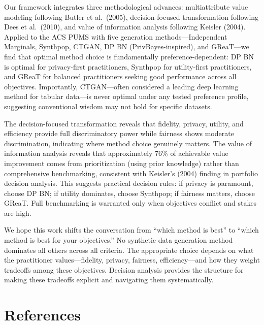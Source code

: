 \documentclass[12pt,a4paper]{article}
\begin{document}
Our framework integrates three methodological advances: multiattribute value modeling following Butler et al.\ (2005), decision-focused transformation following Dees et al.\ (2010), and value of information analysis following Keisler (2004). Applied to the ACS PUMS with five generation methods---Independent Marginals, Synthpop, CTGAN, DP BN (PrivBayes-inspired), and GReaT---we find that optimal method choice is fundamentally preference-dependent: DP BN is optimal for privacy-first practitioners, Synthpop for utility-first practitioners, and GReaT for balanced practitioners seeking good performance across all objectives. Importantly, CTGAN---often considered a leading deep learning method for tabular data---is never optimal under any tested preference profile, suggesting conventional wisdom may not hold for specific datasets.

The decision-focused transformation reveals that fidelity, privacy, utility, and efficiency provide full discriminatory power while fairness shows moderate discrimination, indicating where method choice genuinely matters. The value of information analysis reveals that approximately 76\% of achievable value improvement comes from prioritization (using prior knowledge) rather than comprehensive benchmarking, consistent with Keisler's (2004) finding in portfolio decision analysis. This suggests practical decision rules: if privacy is paramount, choose DP BN; if utility dominates, choose Synthpop; if fairness matters, choose GReaT. Full benchmarking is warranted only when objectives conflict and stakes are high.

We hope this work shifts the conversation from ``which method is best'' to ``which method is best for your objectives.'' No synthetic data generation method dominates all others across all criteria. The appropriate choice depends on what the practitioner values---fidelity, privacy, fairness, efficiency---and how they weight tradeoffs among these objectives. Decision analysis provides the structure for making these tradeoffs explicit and navigating them systematically.

\newpage
\section*{References}
\end{document}

